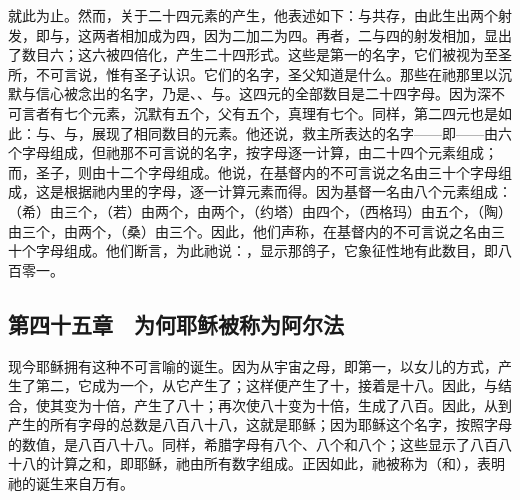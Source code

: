 就此为止。然而，关于二十四元素的产生，他表述如下：与共存，由此生出两个射发，即与，这两者相加成为四，因为二加二为四。再者，二与四的射发相加，显出了数目六；这六被四倍化，产生二十四形式。这些是第一的名字，它们被视为至圣所，不可言说，惟有圣子认识。它们的名字，圣父知道是什么。那些在祂那里以沉默与信心被念出的名字，乃是、、与。这四元的全部数目是二十四字母。因为深不可言者有七个元素，沉默有五个，父有五个，真理有七个。同样，第二四元也是如此：与、与，展现了相同数目的元素。他还说，救主所表达的名字——即——由六个字母组成，但祂那不可言说的名字，按字母逐一计算，由二十四个元素组成；而，圣子，则由十二个字母组成。他说，在基督内的不可言说之名由三十个字母组成，这是根据祂内里的字母，逐一计算元素而得。因为基督一名由八个元素组成：（希）由三个，（若）由两个，由两个，（约塔）由四个，（西格玛）由五个，（陶）由三个，由两个，（桑）由三个。因此，他们声称，在基督内的不可言说之名由三十个字母组成。他们断言，为此祂说：，显示那鸽子，它象征性地有此数目，即八百零一。\par


\subsection{第四十五章　为何耶稣被称为阿尔法}

现今耶稣拥有这种不可言喻的诞生。因为从宇宙之母，即第一，以女儿的方式，产生了第二，它成为一个，从它产生了；这样便产生了十，接着是十八。因此，与结合，使其变为十倍，产生了八十；再次使八十变为十倍，生成了八百。因此，从到产生的所有字母的总数是八百八十八，这就是耶稣；因为耶稣这个名字，按照字母的数值，是八百八十八。同样，希腊字母有八个、八个和八个；这些显示了八百八十八的计算之和，即耶稣，祂由所有数字组成。正因如此，祂被称为（和），表明祂的诞生来自万有。\par

